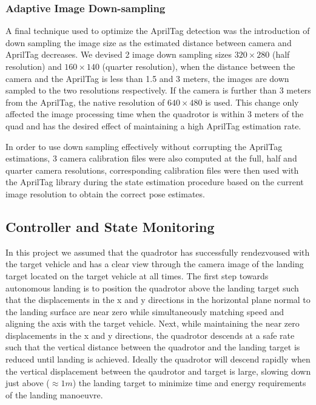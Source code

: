 \documentclass[11pt, twocolumn]{article}
\begin{document}
\subsubsection{Adaptive Image Down-sampling}
A final technique used to optimize the AprilTag detection was the introduction of down sampling the image size as the estimated distance between camera and AprilTag decreases. We devised 2 image down sampling sizes $320 \times 280$ (half resolution) and $160 \times 140$ (quarter resolution), when the distance between the camera and the AprilTag is less than 1.5 and 3 meters, the images are down sampled to the two resolutions respectively. If the camera is further than 3 meters from the AprilTag, the native resolution of $640 \times 480$ is used. This change only affected the image processing time when the quadrotor is within 3 meters of the quad and has the desired effect of maintaining a high AprilTag estimation rate.

In order to use down sampling effectively without corrupting the AprilTag estimations, 3 camera calibration files were also computed at the full, half and quarter camera resolutions, corresponding calibration files were then used with the AprilTag library during the state estimation procedure based on the current image resolution to obtain the correct pose estimates. 

\subsection{Controller and State Monitoring}
\label{subsec:position_controller}
In this project we assumed that the quadrotor has successfully rendezvoused with the target vehicle and has a clear view through the camera image of the landing target located on the target vehicle at all times. The first step towards autonomous landing is to position the quadrotor above the landing target such that the displacements in the x and y directions in the horizontal plane normal to the landing surface are near zero while simultaneously matching speed and aligning the axis with the target vehicle. Next, while maintaining the near zero displacements in the x and y directions, the quadrotor descends at a safe rate such that the vertical distance between the quadrotor and the landing target is reduced until landing is achieved. Ideally the quadrotor will descend rapidly when the vertical displacement between the qaudrotor and target is large, slowing down just above ($\approx 1m$) the landing target to minimize time and energy requirements of the landing manoeuvre. 
\end{document}
